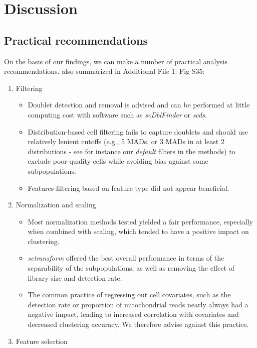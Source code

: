 \documentclass{bmcart}
\begin{document}
\section*{Discussion}

\subsection*{Practical recommendations}

On the basis of our findings, we can make a number of practical analysis recommendations, also summarized in Additional File 1: Fig S35:

\begin{enumerate}
   \item Filtering
   \begin{itemize}
     \item Doublet detection and removal is advised and can be performed at little computing cost with software such as \textit{scDblFinder} or \textit{scds}.
     \item Distribution-based cell filtering fails to capture doublets and should use relatively lenient cutoffs (e.g., 5 MADs, or 3 MADs in at least 2 distributions - see for instance our \textit{default} filters in the methods) to exclude poor-quality cells while avoiding bias against some subpopulations.
     \item Features filtering based on feature type did not appear beneficial.
   \end{itemize}
   \item Normalization and scaling
   \begin{itemize}
     \item Most normalization methods tested yielded a fair performance, especially when combined with scaling, which tended to have a positive impact on clustering.
     \item \textit{sctransform} offered the best overall performance in terms of the separability of the subpopulations, as well as removing the effect of library size and detection rate.
     \item The common practice of regressing out cell covariates, such as the detection rate or proportion of mitochondrial reads nearly always had a negative impact, leading to increased correlation with covariates and decreased clustering accuracy. We therefore advise against this practice.
   \end{itemize}
   \item Feature selection
   \begin{itemize}

\end{itemize}
\end{enumerate}
\end{document}
